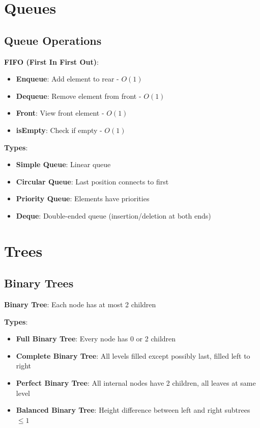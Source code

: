 \documentclass[12pt,a4paper]{report}
\begin{document}
\section{Queues}

\subsection{Queue Operations}
\begin{concept}
\textbf{FIFO (First In First Out)}:
\begin{itemize}
    \item \textbf{Enqueue}: Add element to rear - $O(1)$
    \item \textbf{Dequeue}: Remove element from front - $O(1)$
    \item \textbf{Front}: View front element - $O(1)$
    \item \textbf{isEmpty}: Check if empty - $O(1)$
\end{itemize}

\textbf{Types}:
\begin{itemize}
    \item \textbf{Simple Queue}: Linear queue
    \item \textbf{Circular Queue}: Last position connects to first
    \item \textbf{Priority Queue}: Elements have priorities
    \item \textbf{Deque}: Double-ended queue (insertion/deletion at both ends)
\end{itemize}
\end{concept}

\section{Trees}

\subsection{Binary Trees}
\begin{concept}
\textbf{Binary Tree}: Each node has at most 2 children

\textbf{Types}:
\begin{itemize}
    \item \textbf{Full Binary Tree}: Every node has 0 or 2 children
    \item \textbf{Complete Binary Tree}: All levels filled except possibly last, filled left to right
    \item \textbf{Perfect Binary Tree}: All internal nodes have 2 children, all leaves at same level
    \item \textbf{Balanced Binary Tree}: Height difference between left and right subtrees $\leq 1$
\end{itemize}
\end{concept}
\end{document}
